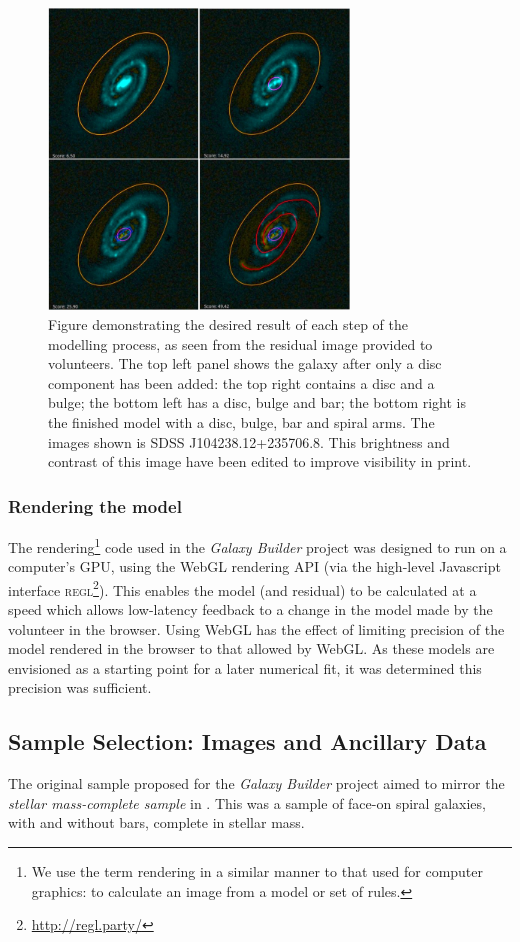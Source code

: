 \documentclass[../main.tex]{subfiles}
\begin{document}
\begin{figure}
  \includegraphics[width=8cm]{images/residualProgress.jpg}
  \caption{Figure demonstrating the desired result of each step of the modelling process, as seen from the residual image provided to volunteers. The top left panel shows the galaxy after only a disc component has been added: the top right contains a disc and a bulge; the bottom left has a disc, bulge and bar; the bottom right is the finished model with a disc, bulge, bar and spiral arms. The images shown is SDSS J104238.12+235706.8. This brightness and contrast of this image have been edited to improve visibility in print.}
  \label{fig:residualsStepByStep}
\end{figure}

\subsubsection{Rendering the model}


The rendering\footnote{We use the term rendering in a similar manner to that used for computer graphics: to calculate an image from a model or set of rules.} code used in the \textit{Galaxy Builder} project was designed to run on a computer's GPU, using the WebGL rendering API (via the high-level Javascript interface \textsc{regl}\footnote{\url{http://regl.party/}}). This enables the model (and residual) to be calculated at a speed which allows low-latency feedback to a change in the model made by the volunteer in the browser. Using WebGL has the effect of limiting precision of the model rendered in the browser to that allowed by WebGL. As these models are envisioned as a starting point for a later numerical fit, it was determined this precision was sufficient.

\subsection{Sample Selection: Images and Ancillary Data}
\label{sec:data}
The original sample proposed for the \textit{Galaxy Builder} project aimed to mirror the \textit{stellar mass-complete sample} in \citet{2017MNRAS.472.2263H}. This was a sample of face-on spiral galaxies, with and without bars, complete in  stellar mass.
\end{document}
